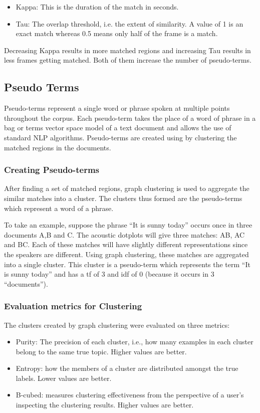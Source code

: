 \documentclass[a4paper]{article}
\begin{document}
\begin{itemize}
\item Kappa: This is the duration of the match in seconds.
\item Tau: The overlap threshold, i.e. the extent of similarity. A value of 1 is an exact match whereas 0.5 means only half of the frame is a match.
\end{itemize}

Decreasing Kappa results in more matched regions and increasing Tau results in less frames getting matched. Both of them increase the number of pseudo-terms.

\subsection{Pseudo Terms}
Pseudo-terms represent a single word or phrase spoken at multiple points throughout the corpus. Each pseudo-term takes the place of a word of phrase in a bag or terms vector space model of a text document and allows the use of standard NLP algorithms. Pseudo-terms are created using by clustering the matched regions in the documents.

\subsubsection{Creating Pseudo-terms}
After finding a set of matched regions, graph clustering is used to aggregate the similar matches into a cluster.
The clusters thus formed are the pseudo-terms which represent a word of a phrase.

To take an example, suppose the phrase “It is sunny today” occurs once in three documents A,B and C. The acoustic dotplots will give three matches: AB, AC and BC. Each of these matches will have slightly different representations since the speakers are different. Using graph clustering, these matches are aggregated into a single cluster. This cluster is a pseudo-term which represents the term “It is sunny today” and has a tf of 3 and idf of 0 (because it occurs in 3 “documents”).

\subsubsection{Evaluation metrics for Clustering}
The clusters created by graph clustering were evaluated on three metrics:

\begin{itemize}
\item Purity: The precision of each cluster, i.e., how many examples in each cluster belong to the same true topic.
Higher values are better.
\item Entropy: how the members of a cluster are distributed amongst the true labels.
Lower values are better.
\item B-cubed: measures clustering effectiveness from the perspective of a user’s inspecting the clustering results.
Higher values are better.
\end{itemize}
\end{document}

